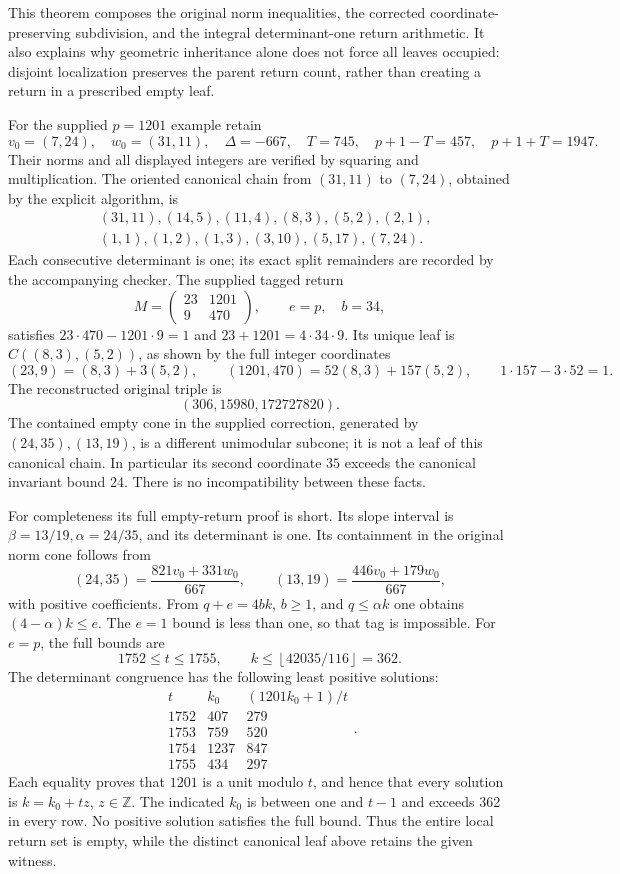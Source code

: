 \documentclass[11pt]{article}
\theoremstyle{definition}\newtheorem{definition}[theorem]{Definition}
\theoremstyle{remark}\newtheorem{remark}[theorem]{Remark}
\newcommand{\Z}{\mathbb Z}\newcommand{\Q}{\mathbb Q}
\begin{document}
This theorem composes the original norm inequalities,
the corrected coordinate-preserving subdivision, and
the integral determinant-one return arithmetic.
It also explains why geometric inheritance alone
does not force all leaves occupied: disjoint
localization preserves the parent return count, rather
than creating a return in a prescribed empty leaf.

For the supplied \(p=1201\) example retain
\[
 v_0=(7,24),\quad w_0=(31,11),\quad
 \Delta=-667,\quad T=745,\quad
 p+1-T=457,\quad p+1+T=1947.
\]
Their norms and all displayed integers are verified by
squaring and multiplication.  The oriented canonical
chain from \((31,11)\) to \((7,24)\), obtained by the
explicit algorithm, is
\begin{align*}
 &(31,11),(14,5),(11,4),(8,3),(5,2),(2,1),\\
 &(1,1),(1,2),(1,3),(3,10),(5,17),(7,24).
\end{align*}
Each consecutive determinant is one; its exact split
remainders are recorded by the accompanying checker.
The supplied tagged return
\[
 M=\begin{pmatrix}23&1201\\9&470\end{pmatrix},\qquad
 e=p,\quad b=34,
\]
satisfies \(23\cdot470-1201\cdot9=1\) and
\(23+1201=4\cdot34\cdot9\).
Its unique leaf is \(C((8,3),(5,2))\), as shown by
the full integer coordinates
\[
 (23,9)=(8,3)+3(5,2),\qquad
 (1201,470)=52(8,3)+157(5,2),\qquad
 1\cdot157-3\cdot52=1.
\]
The reconstructed original triple is
\[
 (306,15980,172727820).
\]
The contained empty cone in the supplied correction,
generated by \((24,35),(13,19)\), is a different
unimodular subcone; it is not a leaf of this canonical
chain.  In particular its second coordinate \(35\)
exceeds the canonical invariant bound \(24\).
There is no incompatibility between these facts.

For completeness its full empty-return proof is short.
Its slope interval is
\(\beta=13/19,\alpha=24/35\), and its determinant is one.
Its containment in the original norm cone follows from
\[
 (24,35)=\frac{821v_0+331w_0}{667},\qquad
 (13,19)=\frac{446v_0+179w_0}{667},
\]
with positive coefficients.  From \(q+e=4bk\),
\(b\ge1\), and \(q\le\alpha k\) one obtains
\((4-\alpha)k\le e\).
The \(e=1\) bound is less than one, so that tag is
impossible.  For \(e=p\), the full bounds are
\[
 1752\le t\le1755,\qquad
 k\le\left\lfloor42035/116\right\rfloor=362.
\]
The determinant congruence has the following least
positive solutions:
\[
 \begin{array}{c|r|r}
 t&k_0&(1201k_0+1)/t\\\hline
 1752&407&279\\
 1753&759&520\\
 1754&1237&847\\
 1755&434&297
 \end{array}.
\]
Each equality proves that \(1201\) is a unit modulo
\(t\), and hence that every solution is
\(k=k_0+tz\), \(z\in\Z\).
The indicated \(k_0\) is between one and \(t-1\) and
exceeds 362 in every row.  No positive solution
satisfies the full bound.  Thus the entire local
return set is empty, while the distinct canonical
leaf above retains the given witness.
\end{document}
